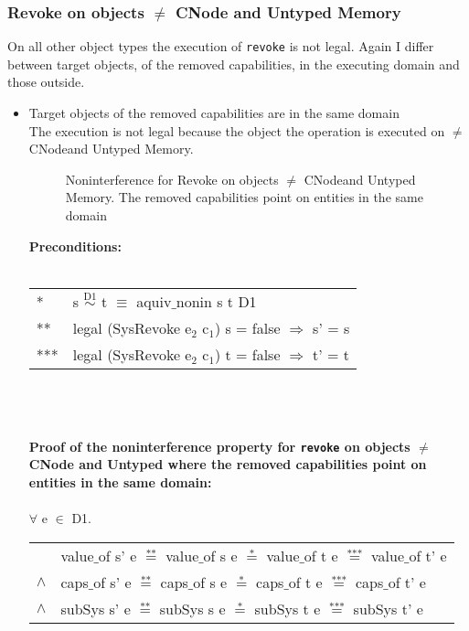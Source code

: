 \subsubsection{Revoke on objects $\neq$ CNode and Untyped Memory} 
On all other object types the execution of \texttt{revoke} is not legal. Again I differ between target objects, of the removed capabilities, in the executing domain and those outside.
\begin{itemize}
\item Target objects of the removed capabilities are in the same domain \\
The execution is not legal because the object the operation is executed on $\neq$ CNodeand Untyped Memory.
\begin{flushleft}
\begin{figure}[H]
\caption{Noninterference for Revoke on objects $\neq$ CNodeand Untyped Memory. The removed capabilities point on entities in the same domain}
\label{fig:RevokeOthers}
\end{figure}
\end{flushleft}
\textbf{Preconditions:} \\ \\
\begin{tabular}{ll}
* & s $\overset{\text{D1}}{\sim}$ t $\equiv$ aquiv$\_$nonin s t D1	\\ 
** & legal (SysRevoke e$_2$ c$_1$) s = false $\Rightarrow$ s' = s \\ 
*** & legal (SysRevoke e$_2$ c$_1$) t = false $\Rightarrow$ t' = t
\end{tabular} \\ \\ \\
\textbf{Proof of the noninterference property for \texttt{revoke} on objects $\neq$ CNode and Untyped where the removed capabilities point on entities in the same domain:}\\ \\
$\forall$ e $\in$ D1. \\
\begin{tabular}{ll}
& value$\_$of s' e $\overset{\text{**}}{=}$ value$\_$of s e $\overset{\text{*}}{=}$ value$\_$of t e $\overset{\text{***}}{=}$ value$\_$of t' e \\
$\wedge$ & caps$\_$of s' e $\overset{\text{**}}{=}$ caps$\_$of s e $\overset{\text{*}}{=}$ caps$\_$of t e $\overset{\text{***}}{=}$ caps$\_$of t' e \\
$\wedge$ & subSys s' e $\overset{\text{**}}{=}$ subSys s e $\overset{\text{*}}{=}$ subSys t e $\overset{\text{***}}{=}$ subSys t' e

\end{tabular}
\end{itemize}
